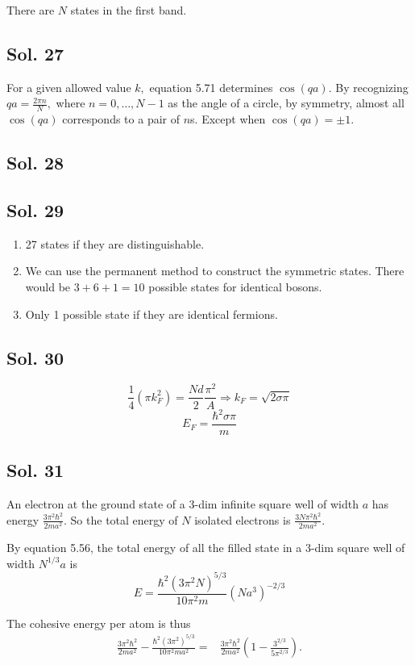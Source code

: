    There are $N$ states in the first band. 

   \subsection*{Sol. 27}
   For a given allowed value $k,$ equation 5.71 determines $\cos(qa).$ By recognizing $qa=\frac{2\pi n}{N},$ where $n=0,\dots,N-1$ as the angle of a circle, by symmetry, almost all $\cos(qa)$ corresponds to a pair of $n$s. Except when $\cos(qa)=\pm 1.$

   \subsection*{Sol. 28}

   \subsection*{Sol. 29}
   \begin{enumerate}
       \item 27 states if they are distinguishable.
       \item We can use the permanent method to construct the symmetric states. There would be $3+6+1=10$ possible states for identical bosons.
       \item Only 1 possible state if they are identical fermions.
   \end{enumerate}

   \subsection*{Sol. 30}
   $$
   \frac{1}{4}
   (\pi k_F^2)
   =\frac{Nd}{2}\frac{\pi^2}{A}\Rightarrow
   k_F=\sqrt{2\sigma\pi}
   $$
   $$
   E_F=\frac{\hbar^2\sigma\pi}{m}
   $$

   \subsection*{Sol. 31}
   An electron at the ground state of  a 3-dim infinite square well of width $a$ has energy $\frac{3\pi^2\hbar^2}{2ma^2}.$ So the total energy of $N$ isolated electrons is $\frac{3N\pi^2\hbar^2}{2ma^2}.$

   By equation 5.56, the total energy of all the filled state in a 3-dim square well of width $N^{1/3}a$ is 
   $$
   E=\frac{\hbar^2(3\pi^2N)^{5/3}}{10\pi^2m}(Na^3)^{-2/3}
   $$

   The cohesive energy per atom is thus 
   \begin{align*}
       \frac{3\pi^2\hbar^2}{2ma^2} - 
       \frac{\hbar^2(3\pi^2)^{5/3}}{10\pi^2ma^2}
       =&
       \frac{3\pi^2\hbar^2}{2ma^2}
       \left(1-\frac{3^{2/3}}{5\pi^{2/3}}\right).
   \end{align*}
    

